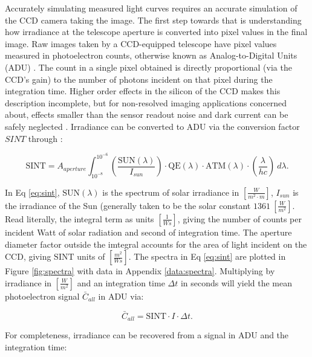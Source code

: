 Accurately simulating measured light curves requires an accurate simulation of the CCD camera taking the image. The first step towards that is understanding how irradiance at the telescope aperture is converted into pixel values in the final image. Raw images taken by a CCD-equipped telescope have pixel values measured in photoelectron counts, otherwise known as Analog-to-Digital Units (ADU) \cite{krag2003}. The count in a single
pixel obtained is directly proportional (via the CCD's gain) to the number of
photons incident on that pixel during the integration time. Higher order effects in the silicon of
the CCD makes this description incomplete, but for non-resolved imaging applications
concerned about, effects smaller than the sensor readout noise and dark current can be safely neglected
\cite{frueh2019notes}. Irradiance can be converted to ADU via the conversion factor $SINT$
through \cite{krag2003}:

\begin{equation} \label{eq:sint}
 \textrm{SINT} = A_{aperture}
	\int_{10^{-8}}^{10^{-6}}{ \left( \frac{\textrm{SUN}(\lambda)}{I_{sun}} \right) \cdot \textrm{QE}(\lambda) \cdot \textrm{ATM}(\lambda)
  \cdot \left( \frac{\lambda}{h c} \right) \: d\lambda}.
\end{equation}

In Eq \ref{eq:sint}, $\textrm{SUN}(\lambda)$ is the spectrum of solar irradiance in 
$\left[\frac{W}{m^2\cdot m} \right]$, $I_{sun}$ is the irradiance of the Sun (generally taken to be
the solar constant $1361 \: \left[ \frac{W}{m^2} \right]$. Read literally, the integral term as
units $\left[ \frac{1}{Ws} \right]$, giving the number of counts per incident Watt of solar
radiation and second of integration time. The aperture diameter factor outside the imtegral accounts
for the area of light incident on the CCD, giving $\textrm{SINT}$ units of $\left[ \frac{m^2}{Ws}
\right]$. The spectra in Eq \ref{eq:sint} are plotted in Figure \ref{fig:spectra} with data in Appendix \ref{data:spectra}. Multiplying by irradiance in $\left[ \frac{W}{m^2} \right]$ and an integration time $\Delta t$ 
in seconds will yield the mean photoelectron signal $\bar{C}_{all}$ in ADU via:

\begin{equation} \label{eq:irrad_to_count}
  \bar{C}_{all} = \textrm{SINT} \cdot I \cdot \Delta t.
\end{equation}

For completeness, irradiance can be recovered from a signal in ADU and the integration time:

